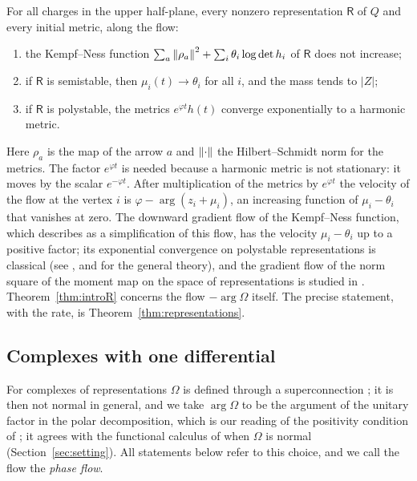 \begin{theorem}[Representations]\label{thm:introR}
For all charges in the upper half-plane, every nonzero representation
$\mathsf R$ of $Q$ and every initial metric, along the flow:
\begin{enumerate}
\item[(i)] the Kempf--Ness function
 $\sum_a\left\lVert\rho_a\right\rVert^2+\sum_i\theta_i\log\det h_i$ of $\mathsf R$ does not
 increase;
\item[(ii)] if $\mathsf R$ is semistable, then $\mu_i(t)\to\theta_i$ for all
 $i$, and the mass tends to $|Z|$;
\item[(iii)] if $\mathsf R$ is polystable, the metrics $e^{\varphi t}h(t)$
 converge exponentially to a harmonic metric.
\end{enumerate}
\end{theorem}

Here $\rho_a$ is the map of the arrow $a$ and $\left\lVert\cdot\right\rVert$ the
Hilbert--Schmidt norm for the metrics. The factor $e^{\varphi t}$ is needed
because a harmonic metric is not stationary: it moves by the scalar
$e^{-\varphi t}$. After multiplication of the metrics by $e^{\varphi t}$ the
velocity of the flow at the vertex $i$ is $\varphi-\arg(z_i+\mu_i)$, an
increasing function of $\mu_i-\theta_i$ that vanishes at zero. The downward
gradient flow of the Kempf--Ness function, which \cite[(5.5)]{hkkp26}
describes as a simplification of this flow, has the velocity
$\mu_i-\theta_i$ up to a positive factor; its exponential convergence on
polystable representations is classical (see \cite[\S5.1]{hkkp23}, and
\cite{grs21} for the general theory), and the gradient flow of the norm
square of the moment map on the space of representations is studied in
\cite{hw11}. Theorem~\ref{thm:introR} concerns the flow $-\arg\Omega$ itself.
The precise statement, with the rate, is Theorem~\ref{thm:representations}.

\subsection{Complexes with one differential}
For complexes of representations $\Omega$ is defined through a
superconnection \cite[\S5.4]{hkkp26}; it is then not normal in general, and
we take $\arg\Omega$ to be the argument of the unitary factor in the polar
decomposition, which is our reading of the positivity condition of
\cite[\S4.2]{hkkp26}; it agrees with the functional calculus of
\cite[\S5.4]{hkkp26} when $\Omega$ is normal (Section~\ref{sec:setting}). All
statements below refer to this choice, and we call the flow the \emph{phase
flow}.

